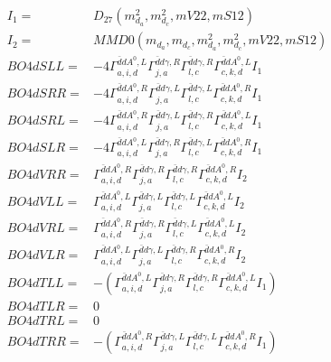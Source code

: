 \documentclass[A4,landscape]{article}
\begin{document}
\begin{align} 
I_1 = & D_{27}(m^2_{d_{{a}}}, m^2_{d_{{c}}}, mV22, mS12) \\ 
I_2 = & MMD0(m_{d_{{a}}}, m_{d_{{c}}}, m^2_{d_{{a}}}, m^2_{d_{{c}}}, mV22, mS12) \\ 
  BO4dSLL= & -4  \Gamma^{\bar{d}d A^0 ,L}_{a, i, d} \Gamma^{\bar{d}d \gamma ,R}_{j, a} \Gamma^{\bar{d}d \gamma ,R}_{l, c} \Gamma^{\bar{d}d A^0 ,L}_{c, k, d} I_1 \\ 
  BO4dSRR= & -4  \Gamma^{\bar{d}d A^0 ,R}_{a, i, d} \Gamma^{\bar{d}d \gamma ,L}_{j, a} \Gamma^{\bar{d}d \gamma ,L}_{l, c} \Gamma^{\bar{d}d A^0 ,R}_{c, k, d} I_1 \\ 
  BO4dSRL= & -4  \Gamma^{\bar{d}d A^0 ,R}_{a, i, d} \Gamma^{\bar{d}d \gamma ,L}_{j, a} \Gamma^{\bar{d}d \gamma ,R}_{l, c} \Gamma^{\bar{d}d A^0 ,L}_{c, k, d} I_1 \\ 
  BO4dSLR= & -4  \Gamma^{\bar{d}d A^0 ,L}_{a, i, d} \Gamma^{\bar{d}d \gamma ,R}_{j, a} \Gamma^{\bar{d}d \gamma ,L}_{l, c} \Gamma^{\bar{d}d A^0 ,R}_{c, k, d} I_1 \\ 
  BO4dVRR= &  \Gamma^{\bar{d}d A^0 ,R}_{a, i, d} \Gamma^{\bar{d}d \gamma ,R}_{j, a} \Gamma^{\bar{d}d \gamma ,R}_{l, c} \Gamma^{\bar{d}d A^0 ,R}_{c, k, d} I_2 \\ 
  BO4dVLL= &  \Gamma^{\bar{d}d A^0 ,L}_{a, i, d} \Gamma^{\bar{d}d \gamma ,L}_{j, a} \Gamma^{\bar{d}d \gamma ,L}_{l, c} \Gamma^{\bar{d}d A^0 ,L}_{c, k, d} I_2 \\ 
  BO4dVRL= &  \Gamma^{\bar{d}d A^0 ,R}_{a, i, d} \Gamma^{\bar{d}d \gamma ,R}_{j, a} \Gamma^{\bar{d}d \gamma ,L}_{l, c} \Gamma^{\bar{d}d A^0 ,L}_{c, k, d} I_2 \\ 
  BO4dVLR= &  \Gamma^{\bar{d}d A^0 ,L}_{a, i, d} \Gamma^{\bar{d}d \gamma ,L}_{j, a} \Gamma^{\bar{d}d \gamma ,R}_{l, c} \Gamma^{\bar{d}d A^0 ,R}_{c, k, d} I_2 \\ 
  BO4dTLL= & -( \Gamma^{\bar{d}d A^0 ,L}_{a, i, d} \Gamma^{\bar{d}d \gamma ,R}_{j, a} \Gamma^{\bar{d}d \gamma ,R}_{l, c} \Gamma^{\bar{d}d A^0 ,L}_{c, k, d} I_1) \\ 
  BO4dTLR= & 0 \\ 
  BO4dTRL= & 0 \\ 
  BO4dTRR= & -( \Gamma^{\bar{d}d A^0 ,R}_{a, i, d} \Gamma^{\bar{d}d \gamma ,L}_{j, a} \Gamma^{\bar{d}d \gamma ,L}_{l, c} \Gamma^{\bar{d}d A^0 ,R}_{c, k, d} I_1) \\ 
\end{align} 
\end{document}
